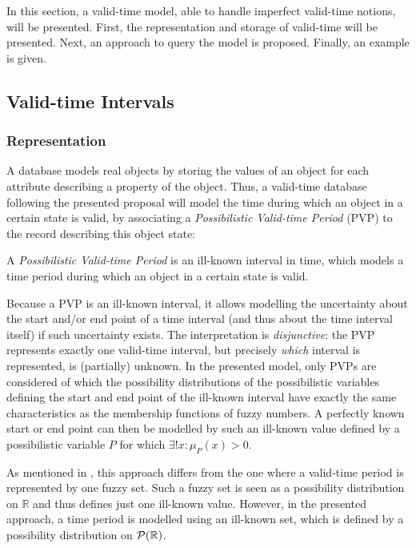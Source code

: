 In this section, a valid-time model, able to handle imperfect valid-time notions, will be presented. First, the representation and storage of valid-time will be presented. Next, an approach to query the model is proposed. Finally, an example is given.

\subsection{Valid-time Intervals}
\subsubsection{Representation}
\label{subsec:representation-ill-known}
A database models real objects by storing the values of an object for each attribute describing a property of the object. Thus, a valid-time database following the presented proposal will model the time during which an object in a certain state is valid, by associating a \emph{Possibilistic Valid-time Period} (PVP) to the record describing this object state:

\begin{definition}
A \emph{Possibilistic Valid-time Period} is an ill-known interval in time, which models a time period during which an object in a certain state is valid.
\end{definition}

Because a PVP is an ill-known interval, it allows modelling the uncertainty about the start and/or end point of a time interval (and thus about the time interval itself) if such uncertainty exists. The interpretation is \emph{disjunctive}: the PVP represents exactly one valid-time interval, but precisely \emph{which} interval is represented, is (partially) unknown. In the presented model, only PVPs are considered of which the possibility distributions of the possibilistic variables defining the start and end point of the ill-known interval have exactly the same characteristics as the membership functions of fuzzy numbers. A perfectly known start or end point can then be modelled by such an ill-known value defined by a possibilistic variable $P$ for which $\exists ! x : \mu_{P}(x) > 0$.

As mentioned in \cite{Pon11}, this approach differs from the one where a valid-time period is represented by one fuzzy set. Such a fuzzy set is seen as a possibility distribution on $\mathbb{R}$ and thus defines just one ill-known value. However, in the presented approach, a time period is modelled using an ill-known set, which is defined by a possibility distribution on $\mathcal{P}(\mathbb{R})$.


